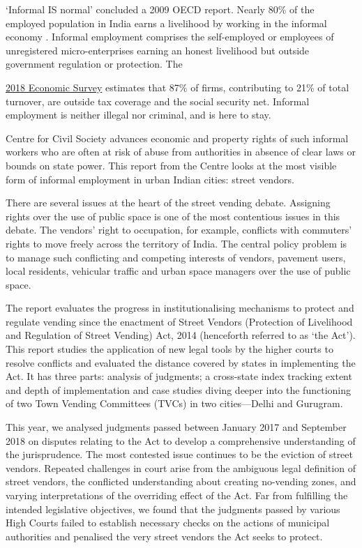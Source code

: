 \documentclass[a4paper, 12pt, twoside, table]{article}
\begin{document}
`Informal IS normal' concluded a 2009 OECD report. Nearly 80\% of the employed population in India earns a livelihood by working in the informal economy \parencite{iloreport}. Informal employment comprises the self-employed or employees of unregistered micro-enterprises earning an honest livelihood but outside government regulation or protection. The {\href{http://mofapp.nic.in:8080/economicsurvey/pdf/032-042_Chapter_02_ENGLISH_Vol_01_2017-18.pdf}{2018 Economic Survey} estimates that 87\% of firms, contributing to 21\% of total turnover, are outside tax coverage and the social security net. Informal employment is neither illegal nor criminal, and is here to stay. 

Centre for Civil Society advances economic and property rights of such informal workers who are often at risk of abuse from authorities in absence of clear laws or bounds on state power. This report from the Centre looks at the most visible form of informal employment in urban Indian cities: street vendors.

There are several issues at the heart of the street vending debate. Assigning rights over the use of public space is one of the most contentious issues in this debate. The vendors’ right to occupation, for example, conflicts with commuters’ rights to move freely across the territory of India. The central policy problem is to manage such conflicting and competing interests of vendors, pavement users, local residents, vehicular traffic and urban space managers over the use of public space. 

The report evaluates the progress in institutionalising mechanisms to protect and regulate vending since the enactment of Street Vendors (Protection of Livelihood and Regulation of Street Vending) Act, 2014 (henceforth referred to as `the Act'). This report studies the application of new legal tools by the higher courts to resolve conflicts and evaluated the distance covered by states in implementing the Act. It has three parts: analysis of judgments; a cross-state index tracking extent and depth of implementation and case studies diving deeper into the functioning of two Town Vending Committees (TVCs) in two cities—Delhi and Gurugram. 

This year, we analysed judgments passed between January 2017 and September 2018 on disputes relating to the Act to develop a comprehensive understanding of the jurisprudence. The most contested issue continues to be the eviction of street vendors. Repeated challenges in court arise from the ambiguous legal definition of street vendors, the conflicted understanding about creating no-vending zones, and varying interpretations of the overriding effect of the Act. Far from fulfilling the intended legislative objectives, we found that the judgments passed by various High Courts failed to establish necessary checks on the actions of municipal authorities and penalised the very street vendors the Act seeks to protect.

}
\end{document}
